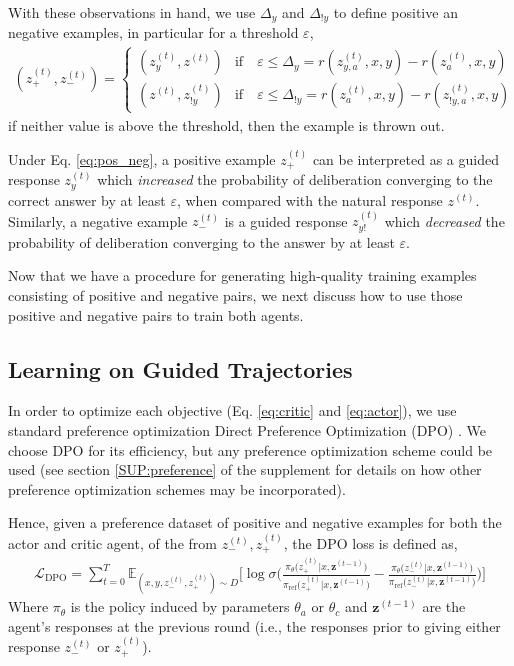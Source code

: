 With these observations in hand, we use $\Delta_{y}$ and $\Delta_{!y}$ to define positive an negative examples, in particular for a threshold $\varepsilon$,
\begin{align}\label{eq:pos_neg}
    (z_{+}^{(t)}, z_-^{(t)}) = \begin{cases}
        (z_{y}^{(t)}, z^{(t)})  & \text{if}\quad \varepsilon \leq \Delta_{y} = r(z_{y,a}^{(t)}, x, y) - r(z_{a}^{(t)}, x, y) \\
        (z^{(t)}, z_{!y}^{(t)}) & \text{if}\quad \varepsilon \leq \Delta_{!y} = r(z_{a}^{(t)}, x, y) - r(z_{!y,a}^{(t)}, x, y) 
    \end{cases}
\end{align}
if neither value is above the threshold, then the example is thrown out. 
\begin{remark}
    Under Eq. \ref{eq:pos_neg}, a positive example $z_+^{(t)}$ can be interpreted as a guided response $z_y^{(t)}$ which \emph{increased} the probability of deliberation converging to the correct answer by at least $\varepsilon$, when compared with the natural response $z^{(t)}$. 
    Similarly, a negative example $z_-^{(t)}$ is a guided response $z_{y!}^{(t)}$ which \emph{decreased} the probability of deliberation converging to the answer by at least $\varepsilon$.
\end{remark}


Now that we have a procedure for generating high-quality training examples consisting of positive and negative pairs, we next discuss how to use those positive and negative pairs to train both agents.

\subsection{Learning on Guided Trajectories}
In order to optimize each objective (Eq. \ref{eq:critic} and \ref{eq:actor}), we use standard preference optimization Direct Preference Optimization (DPO) \cite{rafailov2024direct}. 
We choose DPO for its efficiency, but any preference optimization scheme could be used (see section \ref{SUP:preference} of the supplement for details on how other preference optimization schemes may be incorporated).


Hence, given a preference dataset of positive and negative examples for both the actor and critic agent, of the from $z_-^{(t)}, z_+^{(t)}$, the DPO loss is defined as,
\begin{align}
\mathcal{L}_{\text{DPO}}=\sum_{t=0}^T\mathbb{E}_{(x, y, z_-^{(t)}, z_+^{(t)})\sim D}\bigg[ \log\sigma\bigg(
\frac{\pi_{\theta}\big(z_{+}^{(t)}|x,\mathbf{z}^{(t-1)}\big)}{\pi_{\text{ref}}\big(z_{+}^{(t)}|x,\mathbf{z}^{(t-1)}\big)}
-
\frac{\pi_{\theta}\big(z_{-}^{(t)}|x,\mathbf{z}^{(t-1)}\big)}{\pi_{\text{ref}}\big(z_{-}^{(t)}|x,\mathbf{z}^{(t-1)}\big)}
\bigg)\bigg]
\end{align}
Where $\pi_{\theta}$ is the policy induced by parameters $\theta_a$ or $\theta_c$ and $\mathbf{z}^{(t-1)}$ are the agent's responses at the previous round (i.e., the responses prior to giving either response $z_-^{(t)}$ or $z_+^{(t)}$).

